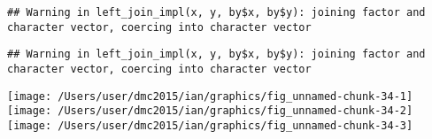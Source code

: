 \documentclass[10pt]{report}
\newenvironment{Shaded}{}{}
\newcommand{\KeywordTok}[1]{\textcolor[rgb]{0.00,0.44,0.13}{\textbf{{#1}}}}
\newcommand{\DataTypeTok}[1]{\textcolor[rgb]{0.56,0.13,0.00}{{#1}}}
\newcommand{\StringTok}[1]{\textcolor[rgb]{0.25,0.44,0.63}{{#1}}}
\newcommand{\NormalTok}[1]{{#1}}
\begin{document}
\begin{verbatim}
## Warning in left_join_impl(x, y, by$x, by$y): joining factor and character vector, coercing into character vector
\end{verbatim}

\begin{Shaded}
\end{Shaded}

\begin{verbatim}
## Warning in left_join_impl(x, y, by$x, by$y): joining factor and character vector, coercing into character vector
\end{verbatim}

\begin{Shaded}
\end{Shaded}

\begin{center}\texttt{[image: /Users/user/dmc2015/ian/graphics/fig\_unnamed-chunk-34-1]} \texttt{[image: /Users/user/dmc2015/ian/graphics/fig\_unnamed-chunk-34-2]} \texttt{[image: /Users/user/dmc2015/ian/graphics/fig\_unnamed-chunk-34-3]} \end{center}
\end{document}
